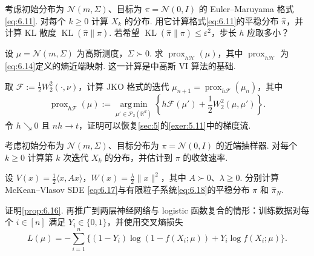 \begin{exercise}\label{exer:6.7}
考虑初始分布为 $\mathcal N(m,\Sigma)$、目标为 $\pi=\mathcal N(0,I)$ 的 Euler--Maruyama 格式\eqref{eq:6.11}. 对每个 $k\geq0$ 计算 $X_k$ 的分布. 用它计算格式\eqref{eq:6.11}的平稳分布 $\widehat\pi$，并计算 KL 散度 $\operatorname{KL}(\widehat\pi\|\pi)$. 若希望 $\operatorname{KL}(\widehat\pi\|\pi)\leq\varepsilon^2$，步长 $h$ 应取多小？
\end{exercise}

\begin{exercise}\label{exer:6.8}
设 $\mu=\mathcal N(m,\Sigma)$ 为高斯测度，$\Sigma\succ0$. 求 $\operatorname{prox}_{h\mathcal H}(\mu)$，其中 $\operatorname{prox}_{h\mathcal H}$ 为\eqref{eq:6.14}定义的熵近端映射. 这一计算是\cite{ref110}中高斯 VI 算法的基础.
\end{exercise}

\begin{exercise}\label{exer:6.9}
取 $\mathcal F:=\frac12W_2^2(\cdot,\nu)$，计算 JKO 格式的迭代 $\mu_{n+1}=\operatorname{prox}_{h\mathcal F}(\mu_n)$，其中
$$
\operatorname{prox}_{h\mathcal F}(\mu):=\operatorname*{arg\,min}_{\mu'\in\mathcal P_2(\mathbb R^d)}
\left\{h\mathcal F(\mu')+\frac12W_2^2(\mu,\mu')\right\}.
$$
令 $h\searrow0$ 且 $nh\to t$，证明可以恢复\autoref{sec:5}的\autoref{exer:5.11}中的梯度流.
\end{exercise}

\begin{exercise}\label{exer:6.10}
考虑初始分布为 $\mathcal N(m,\Sigma)$、目标分布为 $\pi=\mathcal N(0,I)$ 的近端抽样器. 对每个 $k\geq0$ 计算第 $k$ 次迭代 $X_k$ 的分布，并估计到 $\pi$ 的收敛速率.
\end{exercise}

\begin{exercise}\label{exer:6.11}
设 $V(x)=\frac12\langle x,Ax\rangle$，$W(x)=\frac\lambda2\|x\|^2$，其中 $A\succ0$、$\lambda\geq0$. 分别计算 McKean--Vlasov SDE \eqref{eq:6.17}与有限粒子系统\eqref{eq:6.18}的平稳分布 $\pi$ 和 $\widehat\pi_N$.
\end{exercise}

\begin{exercise}\label{exer:6.12}
证明\autoref{prop:6.16}. 再推广到两层神经网络与 logistic 函数复合的情形：训练数据对每个 $i\in[n]$ 满足 $Y_i\in\{0,1\}$，并使用交叉熵损失
$$
L(\mu)=-\sum_{i=1}^n\{(1-Y_i)\log(1-f(X_i;\mu))+Y_i\log f(X_i;\mu)\}.
$$
\end{exercise}
